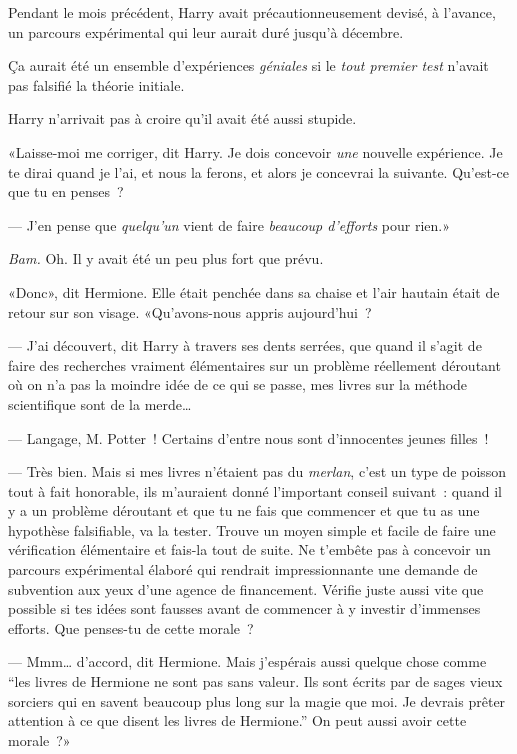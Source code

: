 Pendant le mois précédent, Harry avait précautionneusement devisé, à l'avance, un parcours expérimental qui leur aurait duré jusqu'à décembre.

Ça aurait été un ensemble d'expériences \emph{géniales} si le \emph{tout premier test} n'avait pas falsifié la théorie initiale.

Harry n'arrivait pas à croire qu'il avait été aussi stupide.

«Laisse-moi me corriger, dit Harry. Je dois concevoir \emph{une} nouvelle expérience. Je te dirai quand je l'ai, et nous la ferons, et alors je concevrai la suivante. Qu'est-ce que tu en penses~?

--- J'en pense que \emph{quelqu'un} vient de faire \emph{beaucoup d'efforts} pour rien.»

\emph{Bam.} Oh. Il y avait été un peu plus fort que prévu.

«Donc», dit Hermione. Elle était penchée dans sa chaise et l'air hautain était de retour sur son visage. «Qu'avons-nous appris aujourd'hui~?

--- J'ai découvert, dit Harry à travers ses dents serrées, que quand il s'agit de faire des recherches vraiment élémentaires sur un problème réellement déroutant où on n'a pas la moindre idée de ce qui se passe, mes livres sur la méthode scientifique sont de la merde…

--- Langage, M. Potter~! Certains d'entre nous sont d'innocentes jeunes filles~!

--- Très bien. Mais si mes livres n'étaient pas du \emph{merlan}, c'est un type de poisson tout à fait honorable, ils m'auraient donné l'important conseil suivant~: quand il y a un problème déroutant et que tu ne fais que commencer et que tu as une hypothèse falsifiable, va la tester. Trouve un moyen simple et facile de faire une vérification élémentaire et fais-la tout de suite. Ne t'embête pas à concevoir un parcours expérimental élaboré qui rendrait impressionnante une demande de subvention aux yeux d'une agence de financement. Vérifie juste aussi vite que possible si tes idées sont fausses avant de commencer à y investir d'immenses efforts. Que penses-tu de cette morale~?

--- Mmm… d'accord, dit Hermione. Mais j'espérais aussi quelque chose comme “les livres de Hermione ne sont pas sans valeur. Ils sont écrits par de sages vieux sorciers qui en savent beaucoup plus long sur la magie que moi. Je devrais prêter attention à ce que disent les livres de Hermione.” On peut aussi avoir cette morale~?»

